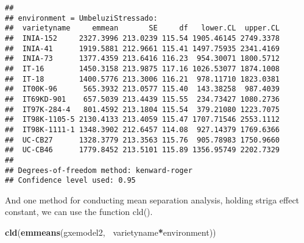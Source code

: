 \documentclass[]{book}
\newenvironment{Shaded}{\begin{snugshade}}{\end{snugshade}}
\newcommand{\KeywordTok}[1]{\textcolor[rgb]{0.13,0.29,0.53}{\textbf{#1}}}
\newcommand{\OperatorTok}[1]{\textcolor[rgb]{0.81,0.36,0.00}{\textbf{#1}}}
\newcommand{\NormalTok}[1]{#1}
\theoremstyle{definition}
\theoremstyle{definition}
\theoremstyle{definition}
\theoremstyle{remark}
\begin{document}
\begin{verbatim}
## 
## environment = UmbeluziStressado:
##  varietyname     emmean       SE     df   lower.CL  upper.CL
##  INIA-152     2327.3996 213.0239 115.54 1905.46145 2749.3378
##  INIA-41      1919.5881 212.9661 115.41 1497.75935 2341.4169
##  INIA-73      1377.4359 213.6416 116.23  954.30071 1800.5712
##  IT-16        1450.3158 213.9875 117.16 1026.53077 1874.1008
##  IT-18        1400.5776 213.3006 116.21  978.11710 1823.0381
##  IT00K-96      565.3932 213.0577 115.40  143.38258  987.4039
##  IT69KD-901    657.5039 213.4439 115.55  234.73427 1080.2736
##  IT97K-284-4   801.4592 213.1804 115.54  379.21080 1223.7075
##  IT98K-1105-5 2130.4133 213.4059 115.47 1707.71546 2553.1112
##  IT98K-1111-1 1348.3902 212.6457 114.08  927.14379 1769.6366
##  UC-CB27      1328.3779 213.3563 115.76  905.78983 1750.9660
##  UC-CB46      1779.8452 213.5101 115.89 1356.95749 2202.7329
## 
## Degrees-of-freedom method: kenward-roger 
## Confidence level used: 0.95
\end{verbatim}

And one method for conducting mean separation analysis, holding striga
effect constant, we can use the function cld().

\begin{Shaded}
\begin{Highlighting}[]
\KeywordTok{cld}\NormalTok{(}\KeywordTok{emmeans}\NormalTok{(gxemodel2, }\OperatorTok{~}\NormalTok{varietyname}\OperatorTok{*}\NormalTok{environment))}
\end{Highlighting}
\end{Shaded}
\end{document}
